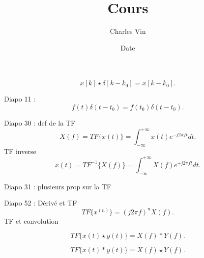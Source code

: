 \documentclass{article}
\title{Cours}
\author{Charles Vin}
\date{Date}
\theoremstyle{plain}%
\theoremstyle{definition}
\theoremstyle{remark}
\begin{document}
\maketitle


\[
    x[k] \star \delta [k - k_0] = x[k-k_0]
.\]

Diapo 11 : 
\[
    f(t) \delta (t - t_0) = f(t_0) \delta (t - t_0)
.\]

Diapo 30 : def de la TF 
\[
    X(f) = TF\{x(t)\} = \int_{-\infty }^{+\infty }x(t)e^{-j2 \pi ft}dt
.\]
TF inverse 
\[
    x(t) = TF^{-1} \{X(f)\} = \int_{-\infty }^{+\infty } X(f) e^{+j2 \pi ft}dt
.\]


Diapo 31 : plusieurs prop sur la TF

Diapo 52 : Dérivé et TF
\[
    TF\{x^{(n)}\} = (j2 \pi f)^n X(f)
.\]
TF et convolution 

\[
    TF\{x(t) \star y(t)\} = X(f) * Y(f)
.\]

\[
    TF\{x(t) * y(t)\} = X(f) \star Y(f)
.\]
\end{document}
